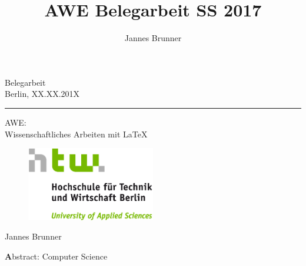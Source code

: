 \documentclass{scrreprt}
\begin{document}
\author{Jannes Brunner}
\title{AWE Belegarbeit SS 2017}

	\begin{titlepage}
		\begin{center}
			{\large Belegarbeit}\\
			{\large Berlin, XX.XX.201X}
			\vspace{0.5cm} \hrule \vspace{0.6cm}
			{\huge AWE: \\ Wissenschaftliches Arbeiten mit LaTeX \\}
			\vspace{0.8cm}
			\begin{figure}[h!]
				\centering
				\includegraphics[width=0.5\textwidth]{images/HTW_Logo_rgb.png}
			\end{figure}
		
			\vspace{0.8cm}
			\large {Jannes Brunner}
		\end{center}
		\vspace{0.6cm}
		{\textbf Abstract}: Computer Science
	
		
	\end{titlepage}
	
	\tableofcontents
	
\end{document}
